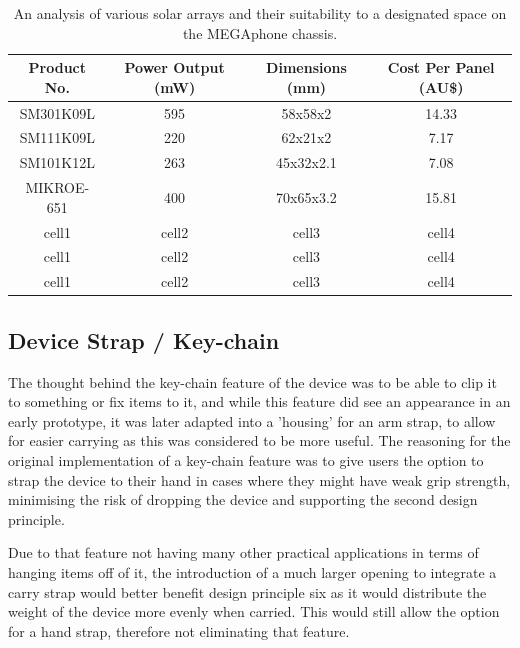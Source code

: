 \begin{table}
    \begin{center}
        \begin{tabular}{ |c|c|c|c| }
        \hline
        Product No. & Power Output (mW) & Dimensions (mm) & Cost Per Panel (AU\$) \\
        \hline
        SM301K09L & 595 & 58x58x2 & 14.33 \\
        \hline
        SM111K09L & 220 & 62x21x2 & 7.17 \\ 
        \hline
        SM101K12L & 263 & 45x32x2.1 & 7.08 \\
        \hline
        MIKROE-651 & 400 & 70x65x3.2 & 15.81 \\
        \hline
        cell1 & cell2 & cell3 & cell4 \\
        \hline
        cell1 & cell2 & cell3 & cell4 \\
        \hline
        cell1 & cell2 & cell3 & cell4 \\
        \hline
        \end{tabular}
    \end{center}
    \caption{An analysis of various solar arrays and their suitability to a designated space on the MEGAphone chassis.}
    \label{fig:SolarTable}
\end{table}


\subsection{Device Strap / Key-chain}

The thought behind the key-chain feature of the device was to be able to clip it to something or fix items to it, and while this feature did see an appearance in an early prototype, it was later adapted into a 'housing' for an arm strap, to allow for easier carrying as this was considered to be more useful.
The reasoning for the original implementation of a key-chain feature was to give users the option to strap the device to their hand in cases where they might have weak grip strength, minimising the risk of dropping the device and supporting the second design principle.

Due to that feature not having many other practical applications in terms of hanging items off of it, the introduction of a much larger opening to integrate a carry strap would better benefit design principle six as it would distribute the weight of the device more evenly when carried.
This would still allow the option for a hand strap, therefore not eliminating that feature.
 
